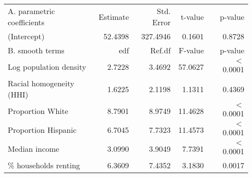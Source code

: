 \begin{table}[ht]
\centering
\begin{tabular}{lrrrr}
   \hline
A. parametric coefficients & Estimate & Std. Error & t-value & p-value \\ 
  (Intercept) & 52.4398 & 327.4946 & 0.1601 & 0.8728 \\ 
   \hline
B. smooth terms & edf & Ref.df & F-value & p-value \\ 
  Log population density & 2.7228 & 3.4692 & 57.0627 & $<$ 0.0001 \\ 
  Racial homogeneity (HHI) & 1.6225 & 2.1198 & 1.1311 & 0.4369 \\ 
  Proportion White & 8.7901 & 8.9749 & 11.4628 & $<$ 0.0001 \\ 
  Proportion Hispanic & 6.7045 & 7.7323 & 11.4573 & $<$ 0.0001 \\ 
  Median income & 3.0990 & 3.9049 & 7.7391 & $<$ 0.0001 \\ 
  \% households renting & 6.3609 & 7.4352 & 3.1830 & 0.0017 \\ 
   \hline
\end{tabular}
\caption{ } 
\label{Demographic GAM}
\end{table}
